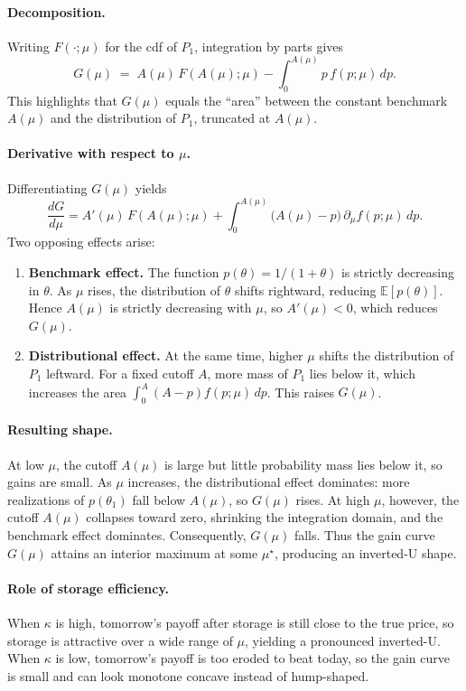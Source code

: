 \paragraph{Decomposition.}  
Writing $F(\cdot;\mu)$ for the cdf of $P_1$, integration by parts gives
\[
G(\mu) \;=\; A(\mu)\,F(A(\mu);\mu) - \int_{0}^{A(\mu)} p\,f(p;\mu)\,dp.
\]
This highlights that $G(\mu)$ equals the ``area'' between the constant benchmark $A(\mu)$ and the distribution of $P_1$, truncated at $A(\mu)$.

\paragraph{Derivative with respect to $\mu$.}  
Differentiating $G(\mu)$ yields
\[
\frac{dG}{d\mu}
= A'(\mu)\,F(A(\mu);\mu)
+ \int_{0}^{A(\mu)} \big(A(\mu)-p\big)\,\partial_{\mu} f(p;\mu)\,dp.
\]
Two opposing effects arise:
\begin{enumerate}
    \item \textbf{Benchmark effect.} The function $p(\theta)=1/(1+\theta)$ is strictly decreasing in $\theta$. As $\mu$ rises, the distribution of $\theta$ shifts rightward, reducing $\mathbb{E}[p(\theta)]$. Hence $A(\mu)$ is strictly decreasing with $\mu$, so $A'(\mu)<0$, which reduces $G(\mu)$.
    \item \textbf{Distributional effect.} At the same time, higher $\mu$ shifts the distribution of $P_1$ leftward. For a fixed cutoff $A$, more mass of $P_1$ lies below it, which increases the area $\int_{0}^{A}(A-p)f(p;\mu)\,dp$. This raises $G(\mu)$.
\end{enumerate}

\paragraph{Resulting shape.}  
At low $\mu$, the cutoff $A(\mu)$ is large but little probability mass lies below it, so gains are small. As $\mu$ increases, the distributional effect dominates: more realizations of $p(\theta_1)$ fall below $A(\mu)$, so $G(\mu)$ rises. At high $\mu$, however, the cutoff $A(\mu)$ collapses toward zero, shrinking the integration domain, and the benchmark effect dominates. Consequently, $G(\mu)$ falls. Thus the gain curve $G(\mu)$ attains an interior maximum at some $\mu^\star$, producing an inverted-U shape.


\paragraph{Role of storage efficiency.}
When $\kappa$ is high, tomorrow’s payoff after storage is still close to the true price, so storage is attractive over a wide range of $\mu$, yielding a pronounced inverted-U. When $\kappa$ is low, tomorrow’s payoff is too eroded to beat today, so the gain curve is small and can look monotone concave instead of hump-shaped.


